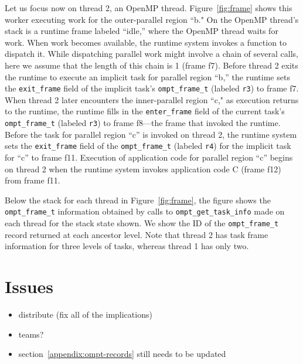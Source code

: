\documentclass{article}
\begin{document}
Let us focus now on thread 2, an OpenMP thread. Figure~\ref{fig:frame}  shows this worker executing  work for the outer-parallel region ``b."
On the OpenMP thread's stack is a runtime frame labeled ``idle,'' where the OpenMP thread waits for work. 
When work becomes available, the runtime system invokes a function to dispatch it. While dispatching parallel work might involve a chain of several calls, here we assume that the length of this chain is 1 (frame f7).  Before thread 2 exits the runtime to execute an implicit task for parallel region ``b,'' the runtime 
sets the \verb|exit_frame| field of the implicit task's \verb|ompt_frame_t| (labeled \verb|r3|) to frame f7. 
When thread 2 later encounters the inner-parallel region ``c,"  as execution returns to the runtime,  the runtime fills in the  \verb|enter_frame| field of the current task's \verb|ompt_frame_t| (labeled \verb|r3|) to frame f8---the frame that invoked the runtime. Before the task for parallel region ``c'' is invoked on thread 2, the runtime system sets the \verb|exit_frame| field  of the \verb|ompt_frame_t| (labeled \verb|r4|) for the implicit task for ``c'' 
to frame f11. Execution of application code for parallel region ``c''  begins on thread 2  when the runtime system invokes application code C (frame f12) from frame f11.


Below the stack for each thread in Figure~\ref{fig:frame}, the figure shows the \verb|ompt_frame_t| information obtained by calls to \verb|ompt_get_task_info| made on each thread for the stack state shown. We show the ID of the \verb|ompt_frame_t| record returned at each ancestor level. Note that thread 2 has task frame information for three levels of tasks, whereas thread 1 has only two.

\clearpage
{\color{red}
\section{Issues}
\begin{itemize}
\item distribute (fix all of the implications)
\item teams?
\item section~\ref{appendix:ompt-records} still needs to be updated
\end{itemize}
}
\end{document}
